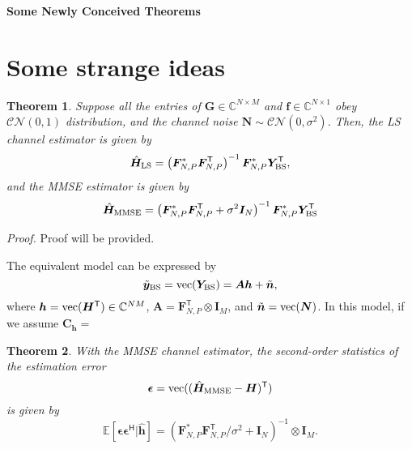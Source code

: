 \documentclass[a4paper,12pt]{article}
\newtheorem{theorem}{\bf Theorem}
\def \T {^{\mathsf{T}}}
\def \H {^{\mathsf{H}}}
\begin{document}
    
\begin{center}
    {\Large\bf Some Newly Conceived Theorems}
\end{center}


\section{Some strange ideas}
\begin{theorem} 
    Suppose all the entries of ${\bm G}\in\mathbb{C}^{N\times M}$ and ${\bm f}\in\mathbb{C}^{N\times 1}$ obey ${\mathcal{CN}(0,1)}$ distribution, and the channel noise ${\bm N}\sim \mathcal{CN}(0,\sigma^2)$. 
    Then, the LS channel estimator is given by 
    \begin{equation}
        \hat{\bm{H}}_{\rm LS} = \left( {\bm F}_{N,P}^{*} {\bm F_{N,P}\T} \right)^{-1}{\bm F}_{N,P}^{*}{\bm Y}_{\rm BS}\T,
    \end{equation}
    and the MMSE estimator is given by 
    \begin{equation}
        \hat{\bm{H}}_{\rm MMSE} = \left( {\bm F}_{N,P}^{*} {\bm F_{N,P}\T + \sigma^2 {\bm I}_N} \right)^{-1}{\bm F}_{N,P}^{*}{\bm Y}_{\rm BS}\T
    \end{equation}
\end{theorem}

{\it Proof.}
Proof will be provided. 

The equivalent model can be expressed by 
\begin{equation}
    \tilde{\bm y}_{\rm BS} = {\rm vec}({\bm Y}_{\rm BS}) = {\bm A}{\bm h} + \tilde{\bm n},
\end{equation}
where ${\bm h} = {\rm vec}({\bm H}\T)\in\mathbb{C}^{NM}$, ${\bm A} = {\bm F}_{N,P}\T\otimes {\bm I}_M$, and $\tilde{\bm n} = {\rm vec}({\bm N})$. In this model, if we assume ${\bm C}_{\bm h} = $ 

\begin{theorem}
    With the MMSE channel estimator, the second-order statistics of the estimation error 
    \begin{equation}
        {\bm \epsilon} = {\rm vec}((\hat{{\bm H}}_{\rm MMSE} - {\bm H})\T)  
    \end{equation}
    is given by 
    \begin{equation}
        \mathbb{E}[{\bm \epsilon}{\bm \epsilon}\H | \hat{\bm h}] = \left( {\bm F}_{N,P}^{*} {\bm F_{N,P}\T / \sigma^2 + {\bm I}_N} \right)^{-1} \otimes {\bm I}_M.
    \end{equation}
\end{theorem}
\end{document}
